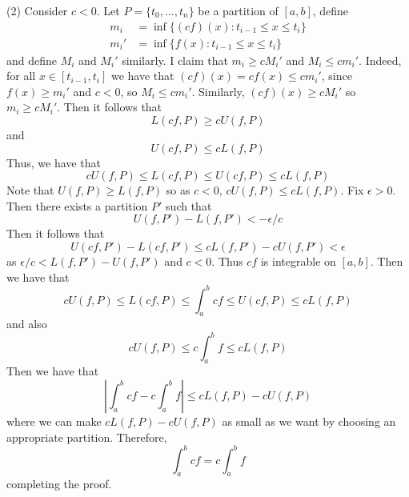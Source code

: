 \documentclass[12pt]{report}
\begin{document}
\begin{proof*}{}{}
    (2) Consider $c < 0$. Let $P = \{t_0,...,t_n\}$ be a partition of $[a,b]$, define \begin{align*}
        m_i &= \inf\{(cf)(x):t_{i-1} \leq x \leq t_i\} \\
        m_i' &= \inf\{f(x):t_{i-1} \leq x \leq t_i\} 
    \end{align*}
    and define $M_i$ and $M_i'$ similarly. I claim that $m_i \geq cM_i'$ and $M_i \leq cm_i'$. Indeed, for all $x \in [t_{i-1},t_i]$ we have that $(cf)(x) = cf(x) \leq cm_i'$, since $f(x) \geq m_i'$ and $c < 0$, so $M_i \leq cm_i'$. Similarly, $(cf)(x) \geq cM_i'$ so $m_i \geq cM_i'$. Then it follows that $$L(cf,P) \geq cU(f,P)$$ and $$U(cf,P) \leq cL(f,P)$$
    Thus, we have that $$cU(f,P) \leq L(cf,P) \leq U(cf,P) \leq cL(f,P)$$
    Note that $U(f,P) \geq L(f,P)$ so as $c < 0$, $cU(f,P) \leq cL(f,P)$. Fix $\epsilon > 0$. Then there exists a partition $P'$ such that $$U(f,P') - L(f,P') < -\epsilon/c$$
    Then it follows that \begin{equation*}
        U(cf,P') - L(cf,P') \leq cL(f,P') - cU(f,P') < \epsilon
    \end{equation*}
    as $\epsilon/c < L(f,P') - U(f,P')$ and $c < 0$. Thus $cf$ is integrable on $[a,b]$. Then we have that \begin{equation*}
        cU(f,P) \leq L(cf,P) \leq \int_a^bcf \leq U(cf,P) \leq cL(f,P)
    \end{equation*}
    and also \begin{equation*}
        cU(f,P) \leq c\int_a^bf\leq cL(f,P)
    \end{equation*}
    Then we have that \begin{equation*}
        \left|\int_a^bcf - c\int_a^bf\right| \leq cL(f,P) - cU(f,P) 
    \end{equation*}
    where we can make $cL(f,P) - cU(f,P)$ as small as we want by choosing an appropriate partition. Therefore, \begin{equation*}
        \int_a^bcf = c\int_a^bf
    \end{equation*}
    completing the proof.
\end{proof*}
\end{document}
